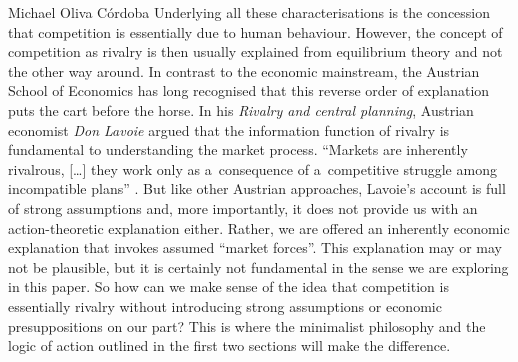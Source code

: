 \begin{artengenv}{Michael Oliva Córdoba}
Underlying all these characterisations is the concession that competition is essentially due to human behaviour. However, the concept of competition as rivalry is then usually explained from equilibrium theory and not the other way around. In contrast to the economic mainstream, the Austrian School of Economics has long recognised that this reverse order of explanation puts the cart before the horse. In his \textit{Rivalry and central planning}, Austrian economist \textit{Don Lavoie} argued that the information function of rivalry is fundamental to understanding the market process. ``Markets are inherently rivalrous, […] they work only as a~consequence of a~competitive struggle among incompatible plans'' 
\parencite[p.~180\ \mbox{[orig.~1985]}]{lavoie_rivalry_2015}. %
 But like other Austrian approaches, Lavoie's account is full of strong assumptions and, more importantly, it does not provide us with an action-theoretic explanation either. Rather, we are offered an inherently economic explanation that invokes assumed ``market forces''. This explanation may or may not be plausible, but it is certainly not fundamental in the sense we are exploring in this paper. So how can we make sense of the idea that competition is essentially rivalry without introducing strong assumptions or economic presuppositions on our part? This is where the minimalist philosophy and the logic of action outlined in the first two sections will make the difference.




\end{artengenv}
